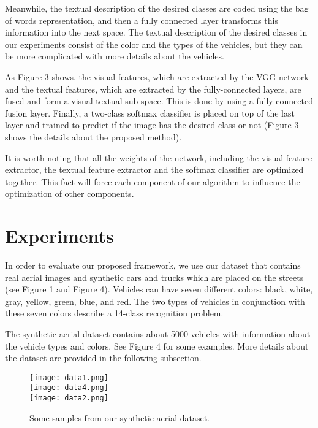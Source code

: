 \documentclass[conference]{IEEEtran}
\begin{document}
Meanwhile, the textual description of the desired classes are coded using the bag of words representation, and then a fully connected layer transforms this information into the next space. The textual description of the desired classes in our experiments consist of the color and the types of the vehicles, but they can be more complicated with more details about the vehicles.

As Figure 3 shows, the visual features, which are extracted by the VGG network and the textual features, which are extracted by the fully-connected layers, are fused and form a visual-textual sub-space. This is done by using a fully-connected fusion layer. Finally, a two-class softmax classifier is placed on top of the last layer and trained to predict if the image has the desired class or not (Figure 3 shows the details about the proposed method).

It is worth noting that all the weights of the network, including the visual feature extractor, the textual feature extractor and the softmax classifier are optimized together. This fact will force each component of our algorithm to influence the optimization of other components.\\

\section{Experiments}
In order to evaluate our proposed framework, we use our dataset that contains real aerial images and synthetic cars and trucks which are placed on the streets (see Figure 1 and Figure 4). Vehicles can have seven different colors: black, white, gray, yellow, green, blue, and red. The two types of vehicles in conjunction with these seven colors describe a 14-class recognition problem.

The synthetic aerial dataset contains about 5000 vehicles with information about the vehicle types and colors. See Figure 4 for some examples. More details about the dataset are provided in the following subsection. \\

\begin{figure}[!t]
\centering
\texttt{[image: data1.png]}
\\
\vspace{5mm}
 \texttt{[image: data4.png]}
 \\
\vspace{5mm}
 \texttt{[image: data2.png]}
\caption{Some samples from our synthetic aerial dataset.}
\label{fig_graph8}
\end{figure}
\end{document}

